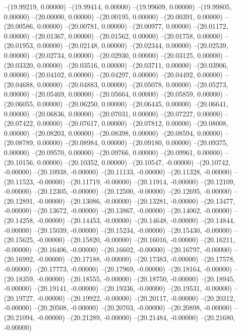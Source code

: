 --(19.99219, 0.00000)
--(19.99414, 0.00000)
--(19.99609, 0.00000)
--(19.99805, 0.00000)
--(20.00000, 0.00000)
--(20.00195, 0.00000)
--(20.00391, 0.00000)
--(20.00586, 0.00000)
--(20.00781, 0.00000)
--(20.00977, 0.00000)
--(20.01172, 0.00000)
--(20.01367, 0.00000)
--(20.01562, 0.00000)
--(20.01758, 0.00000)
--(20.01953, 0.00000)
--(20.02148, 0.00000)
--(20.02344, 0.00000)
--(20.02539, 0.00000)
--(20.02734, 0.00000)
--(20.02930, 0.00000)
--(20.03125, 0.00000)
--(20.03320, 0.00000)
--(20.03516, 0.00000)
--(20.03711, 0.00000)
--(20.03906, 0.00000)
--(20.04102, 0.00000)
--(20.04297, 0.00000)
--(20.04492, 0.00000)
--(20.04688, 0.00000)
--(20.04883, 0.00000)
--(20.05078, 0.00000)
--(20.05273, 0.00000)
--(20.05469, 0.00000)
--(20.05664, 0.00000)
--(20.05859, 0.00000)
--(20.06055, 0.00000)
--(20.06250, 0.00000)
--(20.06445, 0.00000)
--(20.06641, 0.00000)
--(20.06836, 0.00000)
--(20.07031, 0.00000)
--(20.07227, 0.00000)
--(20.07422, 0.00000)
--(20.07617, 0.00000)
--(20.07812, 0.00000)
--(20.08008, 0.00000)
--(20.08203, 0.00000)
--(20.08398, 0.00000)
--(20.08594, 0.00000)
--(20.08789, 0.00000)
--(20.08984, 0.00000)
--(20.09180, 0.00000)
--(20.09375, 0.00000)
--(20.09570, 0.00000)
--(20.09766, 0.00000)
--(20.09961, 0.00000)
--(20.10156, 0.00000)
--(20.10352, 0.00000)
--(20.10547, -0.00000)
--(20.10742, -0.00000)
--(20.10938, -0.00000)
--(20.11133, -0.00000)
--(20.11328, -0.00000)
--(20.11523, -0.00000)
--(20.11719, -0.00000)
--(20.11914, -0.00000)
--(20.12109, -0.00000)
--(20.12305, -0.00000)
--(20.12500, -0.00000)
--(20.12695, -0.00000)
--(20.12891, -0.00000)
--(20.13086, -0.00000)
--(20.13281, -0.00000)
--(20.13477, -0.00000)
--(20.13672, -0.00000)
--(20.13867, -0.00000)
--(20.14062, -0.00000)
--(20.14258, -0.00000)
--(20.14453, -0.00000)
--(20.14648, -0.00000)
--(20.14844, -0.00000)
--(20.15039, -0.00000)
--(20.15234, -0.00000)
--(20.15430, -0.00000)
--(20.15625, -0.00000)
--(20.15820, -0.00000)
--(20.16016, -0.00000)
--(20.16211, -0.00000)
--(20.16406, -0.00000)
--(20.16602, -0.00000)
--(20.16797, -0.00000)
--(20.16992, -0.00000)
--(20.17188, -0.00000)
--(20.17383, -0.00000)
--(20.17578, -0.00000)
--(20.17773, -0.00000)
--(20.17969, -0.00000)
--(20.18164, -0.00000)
--(20.18359, -0.00000)
--(20.18555, -0.00000)
--(20.18750, -0.00000)
--(20.18945, -0.00000)
--(20.19141, -0.00000)
--(20.19336, -0.00000)
--(20.19531, -0.00000)
--(20.19727, -0.00000)
--(20.19922, -0.00000)
--(20.20117, -0.00000)
--(20.20312, -0.00000)
--(20.20508, -0.00000)
--(20.20703, -0.00000)
--(20.20898, -0.00000)
--(20.21094, -0.00000)
--(20.21289, -0.00000)
--(20.21484, -0.00000)
--(20.21680, -0.00000)
